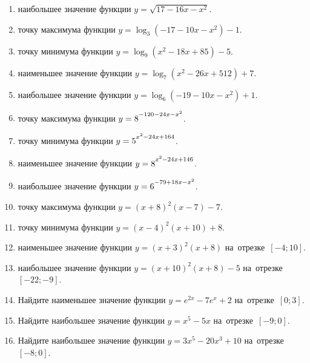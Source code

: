 \documentclass[a4paper,10pt]{article}
\begin{document}
\begin{enumerate}
\item {} наибольшее значение функции $y=\sqrt{17-16x-x^2}$.

\item {} точку максимума функции $y=\log_3\left(-17-10x-x^2\right)-1$.

\item {} точку минимума функции $y=\log_9\left(x^2-18x+85\right)-5$.

\item {} наименьшее значение функции $y=\log_7\left(x^2-26x+512\right)+7$.

\item {} наибольшее значение функции $y=\log_6\left(-19-10x-x^2\right)+1$.

\item {} точку максимума функции $y=8\strut^{-120-24x-x^2}$.

\item {} точку минимума функции $y=5\strut^{x^2-24x+164}$.

\item {} наименьшее значение функции $y=8\strut^{x^2-24x+146}$.

\item {} наибольшее значение функции $y=6\strut^{-79+18x-x^2}$.

\item {} точку максимума функции $y=\left(x+8\right)^2\left(x-7\right)-7$.

\item {} точку минимума функции $y=\left(x-4\right)^2\left(x+10\right)+8$.

\item {} наименьшее значение функции $y=\left(x+3\right)^2\left(x+8\right)$ на~отрезке~$\left[-4;10\right]$.

\item {} наибольшее значение функции $y=\left(x+10\right)^2\left(x+8\right)-5$ на~отрезке~$\left[-22;-9\right]$.

\item Найдите наименьшее значение функции $y=e^{2x}-7e^x+2$ на~отрезке~$\left[0;3\right]$.

\item Найдите наибольшее значение функции $y=x^5-5x$ на~отрезке~$\left[-9;0\right]$.

\item Найдите наибольшее значение функции $y=3x^5-20x^3+10$ на~отрезке~$\left[-8;0\right]$.

\end{enumerate}
\end{document}
